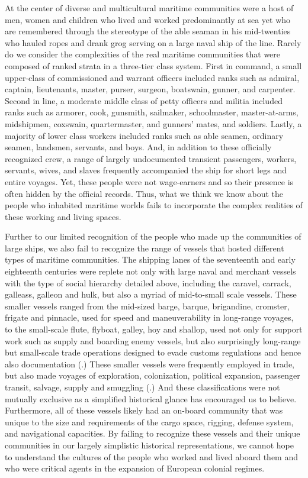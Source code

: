 At the center of diverse and multicultural maritime communities were a host of men, women and children who lived and worked predominantly at sea yet who are remembered through the stereotype of the able seaman in his mid-twenties who hauled ropes and drank grog serving on a large naval ship of the line. Rarely do we consider the complexities of the real maritime communities that were composed of ranked strata in a three-tier class system. First in command, a small upper-class of commissioned and warrant officers included ranks such as admiral, captain, lieutenants, master, purser, surgeon, boatswain, gunner, and carpenter. Second in line, a moderate middle class of petty officers and militia included ranks such as armorer, cook, gunsmith, sailmaker, schoolmaster, master-at-arms, midshipmen, coxswain, quartermaster, and gunners’ mates, and soldiers. Lastly, a majority of lower class workers included ranks such as able seamen, ordinary seamen, landsmen, servants, and boys. And, in addition to these officially recognized crew, a range of largely undocumented transient passengers, workers, servants, wives, and slaves frequently accompanied the ship for short legs and entire voyages. Yet, these people were not wage-earners and so their presence is often hidden by the official records. Thus, what we think we know about the people who inhabited maritime worlds fails to incorporate the complex realities of these working and living spaces.  



Further to our limited recognition of the people who made up the communities of large ships, we also fail to recognize the range of vessels that hosted different types of maritime communities. The shipping lanes of the seventeenth and early eighteenth centuries were replete not only with large naval and merchant vessels with the type of social hierarchy detailed above, including the caravel, carrack, galleass, galleon and hulk, but also a myriad of mid-to-small scale vessels. These smaller vessels ranged from the mid-sized barge, barque, brigandine, cromster, frigate and pinnacle, used for speed and maneuverability in long-range voyages, to the small-scale flute, flyboat, galley, hoy and shallop, used not only for support work such as supply and boarding enemy vessels, but also surprisingly long-range but small-scale trade operations designed to evade customs regulations and hence also documentation (\citealt{Bicheno2012}.) These smaller vessels were frequently employed in trade, but also made voyages of exploration, colonization, political expansion, passenger transit, salvage, supply and smuggling (\citealt{Jarvis2010}.) And these classifications were not mutually exclusive as a simplified historical glance has encouraged us to believe. Furthermore, all of these vessels likely had an on-board community that was unique to the size and requirements of the cargo space, rigging, defense system, and navigational capacities. By failing to recognize these vessels and their unique communities in our largely simplistic historical representations, we cannot hope to understand the cultures of the people who worked and lived aboard them and who were critical agents in the expansion of European colonial regimes. 




